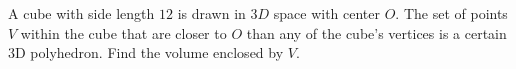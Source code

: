 A cube with side length $12$ is drawn in $3D$ space with center $O$. The set of points $V$ within the cube that are closer to $O$ than any of the cube's vertices is a certain 3D polyhedron. Find the volume enclosed by $V$.
